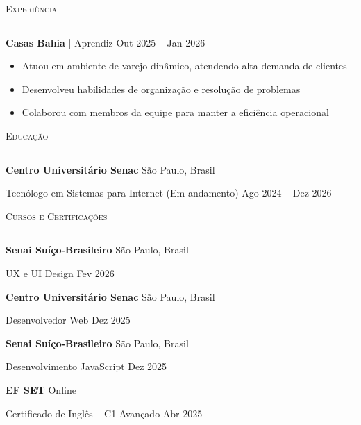 \documentclass[a4paper]{article}
\newcommand{\header}[1]{ \vspace{4mm} {\large\textsc{#1}} \vspace{1mm} \hrule \vspace{2mm} }
\begin{document}
\header{Experiência}

\textbf{Casas Bahia} | Aprendiz \hfill Out 2025 -- Jan 2026

\begin{itemize}[leftmargin=*, nosep]
    \item Atuou em ambiente de varejo dinâmico, atendendo alta demanda de clientes
    \item Desenvolveu habilidades de organização e resolução de problemas
    \item Colaborou com membros da equipe para manter a eficiência operacional
\end{itemize}


\header{Educação}

\textbf{Centro Universitário Senac} \hfill São Paulo, Brasil

Tecnólogo em Sistemas para Internet (Em andamento) \hfill Ago 2024 -- Dez 2026


\header{Cursos e Certificações}

\textbf{Senai Suíço-Brasileiro} \hfill São Paulo, Brasil

UX e UI Design \hfill Fev 2026

\vspace{1mm}

\textbf{Centro Universitário Senac} \hfill São Paulo, Brasil

Desenvolvedor Web \hfill Dez 2025

\vspace{1mm}

\textbf{Senai Suíço-Brasileiro} \hfill São Paulo, Brasil

Desenvolvimento JavaScript \hfill Dez 2025

\vspace{1mm}

\textbf{EF SET} \hfill Online

Certificado de Inglês -- C1 Avançado \hfill Abr 2025
\end{document}
